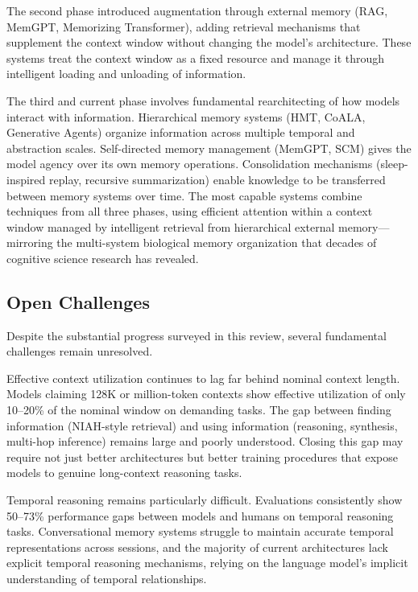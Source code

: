 \documentclass[11pt,letterpaper]{article}
\begin{document}
The second phase introduced augmentation through external memory (RAG, MemGPT, Memorizing Transformer), adding retrieval mechanisms that supplement the context window without changing the model's architecture. These systems treat the context window as a fixed resource and manage it through intelligent loading and unloading of information.

The third and current phase involves fundamental rearchitecting of how models interact with information. Hierarchical memory systems (HMT, CoALA, Generative Agents) organize information across multiple temporal and abstraction scales. Self-directed memory management (MemGPT, SCM) gives the model agency over its own memory operations. Consolidation mechanisms (sleep-inspired replay, recursive summarization) enable knowledge to be transferred between memory systems over time. The most capable systems combine techniques from all three phases, using efficient attention within a context window managed by intelligent retrieval from hierarchical external memory---mirroring the multi-system biological memory organization that decades of cognitive science research has revealed.

\subsection{Open Challenges}

Despite the substantial progress surveyed in this review, several fundamental challenges remain unresolved.

Effective context utilization continues to lag far behind nominal context length. Models claiming 128K or million-token contexts show effective utilization of only 10--20\% of the nominal window on demanding tasks. The gap between finding information (NIAH-style retrieval) and using information (reasoning, synthesis, multi-hop inference) remains large and poorly understood. Closing this gap may require not just better architectures but better training procedures that expose models to genuine long-context reasoning tasks.

Temporal reasoning remains particularly difficult. Evaluations consistently show 50--73\% performance gaps between models and humans on temporal reasoning tasks. Conversational memory systems struggle to maintain accurate temporal representations across sessions, and the majority of current architectures lack explicit temporal reasoning mechanisms, relying on the language model's implicit understanding of temporal relationships.
\end{document}
